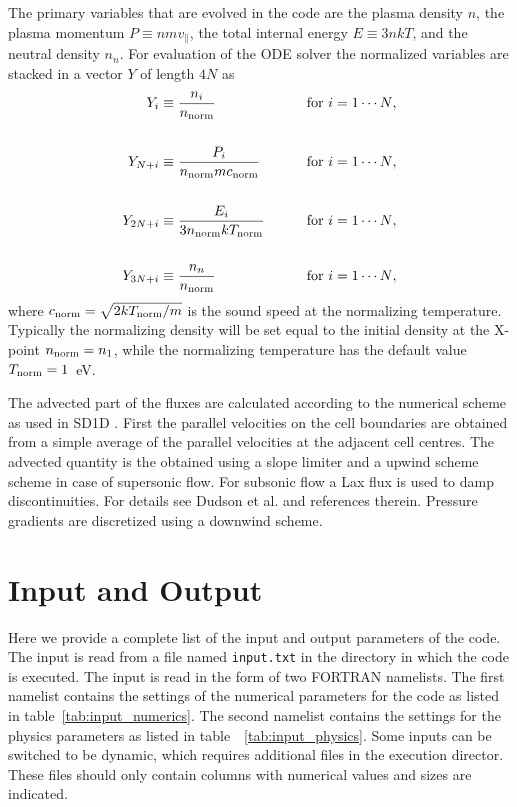 \documentclass[amsmath,amssymb,a4]{revtex4-2}
\begin{document}
The primary variables that are evolved in the code are the plasma density $n$, the plasma momentum $P \equiv n m v_\parallel$, the total internal energy $E \equiv 3 n k T$, and the neutral density $n_n$. For evaluation of the ODE solver the normalized variables are stacked in a vector $Y$ of length $4N$ as
\begin{eqnarray}
    Y_i        &\equiv {\displaystyle n_i \over n_{\rm norm} } &\quad\quad\hbox{for $i = 1 \cdots N$}, \nonumber \\ \nonumber \\
    Y_{N + i}  &\equiv {\displaystyle P_i \over n_{\rm norm} m c_{\rm norm} } &\quad\quad\hbox{for $i = 1 \cdots N$}, \nonumber \\ \label{solution_vector} \\
    Y_{2N + i} &\equiv {\displaystyle E_i \over 3 n_{\rm norm} k T_{\rm norm} } &\quad\quad\hbox{for $i = 1 \cdots N$},  \nonumber\\ \nonumber \\
    Y_{3N + i} &\equiv {\displaystyle n_n \over n_{\rm norm} } &\quad\quad\hbox{for $i = 1 \cdots N$}, \nonumber
\end{eqnarray}
where $c_{\rm norm} = \sqrt{2 k T_{\rm norm}/m}$ is the sound speed at the normalizing temperature. Typically the normalizing density will be set equal to the initial density at the X-point $n_{\rm norm} = n_1$, while the normalizing temperature has the default value $T_{\rm norm} = 1$~eV.

The advected part of the fluxes are calculated according to the numerical scheme as used in SD1D \cite{SD1D}. First the parallel velocities on the cell boundaries are obtained from a simple average of the parallel velocities at the adjacent cell centres. The advected quantity is the obtained using a slope limiter and a upwind scheme scheme in case of supersonic flow. For subsonic flow a Lax flux is used to damp discontinuities. For details see Dudson et al. \cite{dudson2019} and references therein. Pressure gradients are discretized using a downwind scheme.


\section{Input and Output}\label{IO}

Here we provide a complete list of the input and output parameters of the code. The input is read from a file named {\tt input.txt} in the directory in which the code is executed. The input is read in the form of two FORTRAN namelists. The first namelist contains the settings of the numerical parameters for the code as listed in table~\ref{tab:input_numerics}. The second namelist contains the settings for the physics parameters as listed in table~~\ref{tab:input_physics}. Some inputs can be switched to be dynamic, which requires additional files in the execution director. These files should only contain columns with numerical values and sizes are indicated. \\
\end{document}

